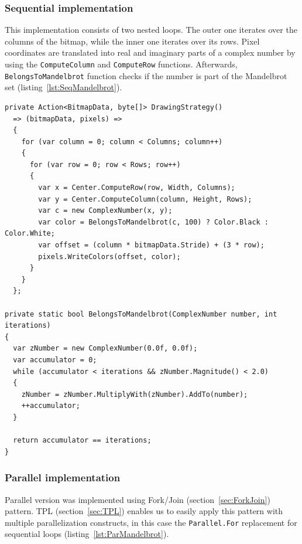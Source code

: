 \pagebreak
\subsubsection{Sequential implementation}
This implementation consists of two nested loops. The outer one iterates over the columns of the bitmap, while the inner one iterates over its rows. 
Pixel coordinates are translated into real and imaginary parts of a complex number by using the \texttt{ComputeColumn} and \texttt{ComputeRow} functions. Afterwards, \texttt{BelongsToMandelbrot} function checks if the number is part of the Mandelbrot set (listing~\ref{lst:SeqMandelbrot}).

\begin{lstlisting}[style=sharpcstyle, caption={Sequential \texttt{Mandelbrot} algorithm}, label={lst:SeqMandelbrot},
numbers=none, xleftmargin=0pt,framexleftmargin=0pt,framexrightmargin=0pt,framexbottommargin=0pt]
private Action<BitmapData, byte[]> DrawingStrategy()
  => (bitmapData, pixels) =>
  {
    for (var column = 0; column < Columns; column++) 
    {
      for (var row = 0; row < Rows; row++) 
      {
        var x = Center.ComputeRow(row, Width, Columns); 
        var y = Center.ComputeColumn(column, Height, Rows); 
        var c = new ComplexNumber(x, y);
        var color = BelongsToMandelbrot(c, 100) ? Color.Black : Color.White; 
        var offset = (column * bitmapData.Stride) + (3 * row);
        pixels.WriteColors(offset, color);
      }
    }
  };

private static bool BelongsToMandelbrot(ComplexNumber number, int iterations)
{
  var zNumber = new ComplexNumber(0.0f, 0.0f);
  var accumulator = 0;
  while (accumulator < iterations && zNumber.Magnitude() < 2.0)
  {
    zNumber = zNumber.MultiplyWith(zNumber).AddTo(number);
    ++accumulator;
  }

  return accumulator == iterations;
}
\end{lstlisting}

\subsubsection{Parallel implementation}
Parallel version was implemented using Fork/Join (section~\ref{sec:ForkJoin}) pattern. TPL (section~\ref{sec:TPL}) enables us to easily apply this pattern with multiple parallelization constructs, in this case the \texttt{Parallel.For} replacement for sequential loops (listing~\ref{lst:ParMandelbrot}).

